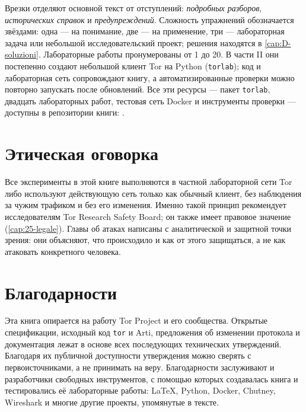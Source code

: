 Врезки отделяют основной текст от отступлений: \emph{подробных разборов}, \emph{исторических справок} и \emph{предупреждений}. Сложность упражнений обозначается звёздами: одна --- на понимание, две --- на применение, три --- лабораторная задача или небольшой исследовательский проект; решения находятся в \cref{cap:D-soluzioni}. Лабораторные работы пронумерованы от 1 до 20. В части II они постепенно создают небольшой клиент Tor на Python (\texttt{torlab}); код и лабораторная сеть сопровождают книгу, а автоматизированные проверки можно повторно запускать после обновлений. Все эти ресурсы --- пакет \texttt{torlab}, двадцать лабораторных работ, тестовая сеть Docker и инструменты проверки --- доступны в репозитории книги: \repolibro.

\section*{Этическая оговорка}

Все эксперименты в этой книге выполняются в частной лабораторной сети Tor либо используют действующую сеть только как обычный клиент, без наблюдения за чужим трафиком и без его изменения. Именно такой принцип рекомендует исследователям Tor Research Safety Board; он также имеет правовое значение (\cref{cap:25-legale}). Главы об атаках написаны с аналитической и защитной точки зрения: они объясняют, что происходило и как от этого защищаться, а не как атаковать конкретного человека.

\section*{Благодарности}

Эта книга опирается на работу Tor Project и его сообщества. Открытые спецификации, исходный код \texttt{tor} и Arti, предложения об изменении протокола и документация лежат в основе всех последующих технических утверждений. Благодаря их публичной доступности утверждения можно сверять с первоисточниками, а не принимать на веру. Благодарности заслуживают и разработчики свободных инструментов, с помощью которых создавалась книга и тестировались её лабораторные работы: \LaTeX{}, Python, Docker, Chutney, Wireshark и многие другие проекты, упомянутые в тексте.
